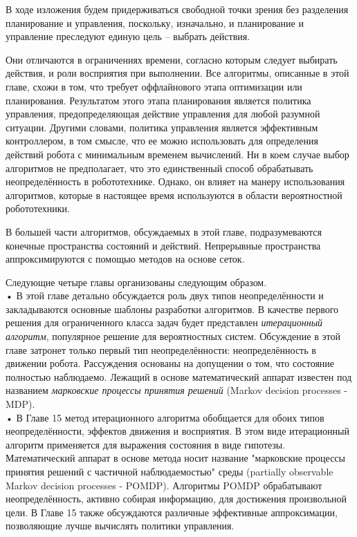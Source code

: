 \documentclass[10pt,a4paper]{article}
\begin{document}
В ходе изложения будем придерживаться свободной точки зрения без разделения планирование и управления, поскольку, изначально, и планирование и управление преследуют единую цель – выбрать действия. 

Они отличаются в ограничениях времени, согласно которым следует выбирать действия, и роли восприятия при выполнении. Все алгоритмы, описанные в этой главе, схожи в том, что требует оффлайнового этапа оптимизации или планирования. Результатом этого этапа планирования является политика управления, предопределяющая действие управления для любой разумной ситуации. Другими словами, политика управления является эффективным контроллером, в том смысле, что ее можно использовать для определения действий робота с минимальным временем вычислений. Ни в коем случае выбор алгоритмов не предполагает, что это единственный способ обрабатывать неопределённость в робототехнике. Однако, он влияет на манеру использования алгоритмов, которые в настоящее время используются в области вероятностной робототехники.

В большей части алгоритмов, обсуждаемых в этой главе, подразумеваются конечные пространства состояний и действий. Непрерывные пространства аппроксимируются с помощью методов на основе сеток.

Следующие четыре главы организованы следующим образом.\\

•	В этой главе детально обсуждается роль двух типов неопределённости и закладываются основные шаблоны разработки алгоритмов. В качестве первого решения для ограниченного класса задач будет представлен  \textit{итерационный алгоритм}, популярное решение для вероятностных систем. Обсуждение в этой главе затронет только первый тип неопределённости: неопределённость в движении робота. Рассуждения основаны на допущении о том, что состояние полностью наблюдаемо. Лежащий в основе математический аппарат известен под названием \textit{марковские процессы принятия решений} (Markov decision processes - MDP).\\

•	В Главе 15 метод итерационного алгоритма обобщается для обоих типов неопределённости, эффектов движения и восприятия. В этом виде итерационный алгоритм применяется для выражения состояния в виде гипотезы. Математический аппарат в основе метода носит название "марковские процессы принятия решений с частичной наблюдаемостью" среды (partially observable Markov decision processes - POMDP). Алгоритмы POMDP обрабатывают неопределённость, активно собирая информацию, для достижения произвольной цели. В Главе 15 также обсуждаются различные эффективные аппроксимации, позволяющие лучше вычислять политики управления.\\
\end{document}
